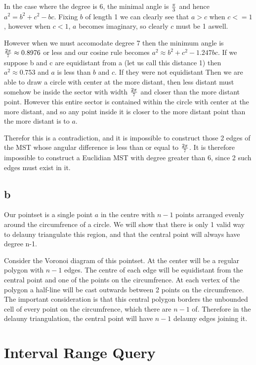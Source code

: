 \documentclass{article}
\begin{document}
In the case where the degree is 6, the minimal angle is $\pi \over 3$ and hence $a^2 = b^2 + c^2 - bc$.
Fixing $b$ of length 1 we can clearly see that $a > c$ when $c <= 1$, however when $c < 1$, $a$ becomes imaginary, so clearly $c$ must be 1 aswell.

However when we must accomodate degree 7 then the minimum angle is ${{2\pi} \over 7} \approx 0.8976$ or less and our cosine rule becomes $a^2 \approx b^2 + c^2 - 1.247 b c$.
If we suppose b and c are equidistant from a (let us call this distance 1) then $a^2 \approx 0.753$ and $a$ is less than $b$ and $c$.
If they were not equidistant Then we are able to draw a circle with center at the more distant, then less distant must somehow be inside the sector with width ${2\pi} \over 7$ and closer than the more distant point.
However this entire sector is contained within the circle with center at the more distant, and so any point inside it is closer to the more distant point than the more distant is to $a$.

Therefor this is a contradiction, and it is impossible to construct those 2 edges of the MST whose angular difference is less than or equal to ${2 \pi} \over 7$.
It is therefore impossible to construct a Euclidian MST with degree greater than 6, since 2 such edges must exist in it.

\subsection*{b}

Our pointset is a single point $a$ in the centre with $n-1$ points arranged evenly around the circumfrence of a circle.
We will show that there is only 1 valid way to delauny triangulate this region, and that the central point will always have degree n-1.

Consider the Voronoi diagram of this pointset.
At the center will be a regular polygon with $n-1$ edges.
The centre of each edge will be equidistant from the central point and one of the points on the circumfrence.
At each vertex of the polygon a half-line will be cast outwards between 2 points on the circumfrence.
The important consideration is that this central polygon borders the unbounded cell of every point on the circumfrence, which there are $n-1$ of.
Therefore in the delauny triangulation, the central point will have $n-1$ delauny edges joining it.

\section {Interval Range Query}
\end{document}
